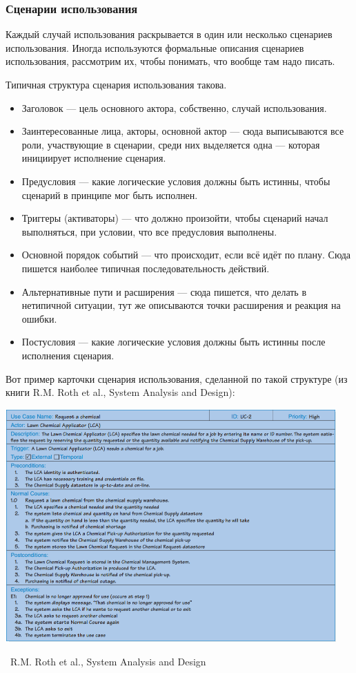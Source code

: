 \documentclass[a5paper]{article}
\newcommand{\attribution}[1] {
    \vspace{-4mm}\begin{flushright}\begin{scriptsize}%
    {\textcopyright\, #1}\end{scriptsize}\end{flushright}
}
\begin{document}
\subsubsection{Сценарии использования}

Каждый случай использования раскрывается в один или несколько сценариев использования. Иногда используются формальные описания сценариев использования, рассмотрим их, чтобы понимать, что вообще там надо писать.

Типичная структура сценария использования такова.

\begin{itemize}
    \item Заголовок --- цель основного актора, собственно, случай использования.
    \item Заинтересованные лица, акторы, основной актор --- сюда выписываются все роли, участвующие в сценарии, среди них выделяется одна --- которая инициирует исполнение сценария.
    \item Предусловия --- какие логические условия должны быть истинны, чтобы сценарий в принципе мог быть исполнен.
    \item Триггеры (активаторы) --- что должно произойти, чтобы сценарий начал выполняться, при условии, что все предусловия выполнены.
    \item Основной порядок событий --- что происходит, если всё идёт по плану. Сюда пишется наиболее типичная последовательность действий.
    \item Альтернативные пути и расширения --- сюда пишется, что делать в нетипичной ситуации, тут же описываются точки расширения и реакция на ошибки.
    \item Постусловия --- какие логические условия должны быть истинны после исполнения сценария.
\end{itemize}

Вот пример карточки сценария использования, сделанной по такой структуре (из книги  R.M. Roth et al., System Analysis and Design):

\begin{center}
    \includegraphics[width=0.95\textwidth]{useCaseExample.png}
    \attribution{R.M. Roth et al., System Analysis and Design}
\end{center}
\end{document}
